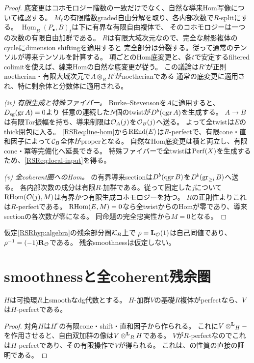 \begin{proof}
底変更はコホモロジー階数の一致だけでなく、自然な導来Hom写像について確認する。
$M_\ell$の有限階数graded自由分解を取り、各内部次数で$R$-splitにする。
$\underline{\operatorname{Hom}}_B(P_\bullet,B)_t$は下に有界な有限自由複体で、
そのコホモロジーは一つの次数の有限自由加群である。
$R$は有限大域次元なので、完全な射影複体のcycleにdimension shiftingを適用すると
完全部分は分裂する。従って通常のテンソルが導来テンソルを計算する。
項ごとのHom底変更と、各$t$で安定するfiltered colimitを使えば、線束Homの自然な底変更が従う。
この議論は$R'\!$が正則noetherian・有限大域次元で$A\otimes_RR'$がnoetherianである
通常の底変更に適用され、特に剰余体と分数体に適用される。

\emph{(iv) 有限生成と特殊ファイバー。}
Burke--Stevenson\cite[Theorem 6.4]{RSRBS}を$A$に適用すると、$D_{\mathrm{sg}}(\operatorname{gr} A)=0$より
任意の連続した$N$個のtwistが$D^b(\operatorname{qgr} A)$を生成する。
$A\to B$は有限Tor振幅を持ち、導来制限は$\mathcal O_A(j)$を$\mathcal O_B(j)$へ送る。
よって全twistは$E$のthick閉包に入る。
\eqref{RSReq:line-hom}から$\operatorname{REnd}(E)$は$R$-perfectで、有限cone・直和因子によって$\mathcal C_B$全体がproperとなる。
自然なHom底変更は積と両立し、有限cone・冪等完備化へ延長できる。
特殊ファイバーで全twistは$\operatorname{Perf}(X)$を生成するため、\eqref{RSReq:local-input}を得る。

\emph{(v) 全coherent圏へのHom。}
\cite[Proposition 4.18]{RSRBS}の有界導来sectionは$D^b(\operatorname{qgr} B)$を$D^b(\operatorname{gr}_{\ge i}B)$へ送る。
各内部次数の成分は有限$R$-加群である。従って固定した$j$について
$\operatorname{RHom}(\mathcal O(j),M)$は有界かつ有限生成コホモロジーを持つ。
$R$の正則性よりこれは$R$-perfectである。
$\operatorname{RHom}(E,M)=0$なら全twistからのHomが零であり、導来sectionの各次数が零になる。
同命題の完全忠実性から$M=0$となる。
\end{proof}

\begin{corollary}[局所量子化のrotation]\label{RSRcor:local-rotation}
仮定\ref{RSRhyp:algebra}の残余部分圏$\mathcal K_B$上で
$\rho=\mathbf L_{\mathcal O}(1)$は自己同値であり、$\rho^{-1}=(-1)\mathbf R_{\mathcal O}$である。
残余smoothnessは仮定しない。
\end{corollary}

\section{smoothnessと全coherent残余圏}\label{RSRsec:fullness}
\begin{lemma}\label{RSRlem:pseudoperfect}
$H$は可換環$R$上smoothなdg代数とする。
$H$-加群$V$の基礎$R$複体がperfectなら、$V$は$H$-perfectである。
\end{lemma}
\begin{proof}
対角$H$は$H^e$の有限cone・shift・直和因子から作られる。
これに$V\mathbin{\otimes^{\mathbf L}}_H-$を作用させると、自由双加群の像は$V\mathbin{\otimes^{\mathbf L}}_RH$である。
$V$が$R$-perfectなのでこれは$H$-perfectであり、その有限操作で$V$が得られる。
これは\cite[Lemma 2.8(2)]{RSRTV}、\cite[F6]{RSRToen}の性質の直接の証明である。
\end{proof}

